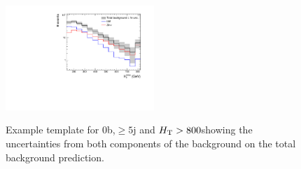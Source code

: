 \begin{figure}[h!]
  \centering
  \includegraphics[width=0.5\textwidth]{figures/template/exampleTemplate13TeV.pdf}
  \\
  \caption{\label{fig:exampleTemplate13} Example template for 0b,$\ge5$j and $\scalht > 800$\GeV showing the uncertainties from both
components of the background on the total background prediction.}
  
\end{figure}

%
%

